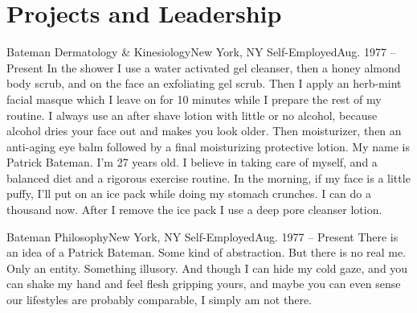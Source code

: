 \section{Projects and Leadership}
    \resumeSubHeadingListStart
        \resumeSubheading
            {Bateman Dermatology \& Kinesiology}{New York, NY}
            {Self-Employed}{Aug. 1977 -- Present}
        \resumeItemListStart
                {In the shower I use a water activated gel cleanser, then a honey almond body scrub, and on the face an exfoliating gel scrub. Then I apply an herb-mint facial masque which I leave on for 10 minutes while I prepare the rest of my routine. I always use an after shave lotion with little or no alcohol, because alcohol dries your face out and makes you look older. Then moisturizer, then an anti-aging eye balm followed by a final moisturizing protective lotion.}
                {My name is Patrick Bateman. I’m 27 years old. I believe in taking care of myself, and a balanced diet and a rigorous exercise routine. In the morning, if my face is a little puffy, I’ll put on an ice pack while doing my stomach crunches. I can do a thousand now. After I remove the ice pack I use a deep pore cleanser lotion. }
        \resumeItemListEnd
        
        \resumeSubheading
            {Bateman Philosophy}{New York, NY}
            {Self-Employed}{Aug. 1977 -- Present}
        \resumeItemListStart
                {There is an idea of a Patrick Bateman. Some kind of abstraction. But there is no real me. Only an entity. Something illusory. And though I can hide my cold gaze, and you can shake my hand and feel flesh gripping yours, and maybe you can even sense our lifestyles are probably comparable, I simply am not there.}
            \resumeItemListEnd

    \resumeSubHeadingListEnd